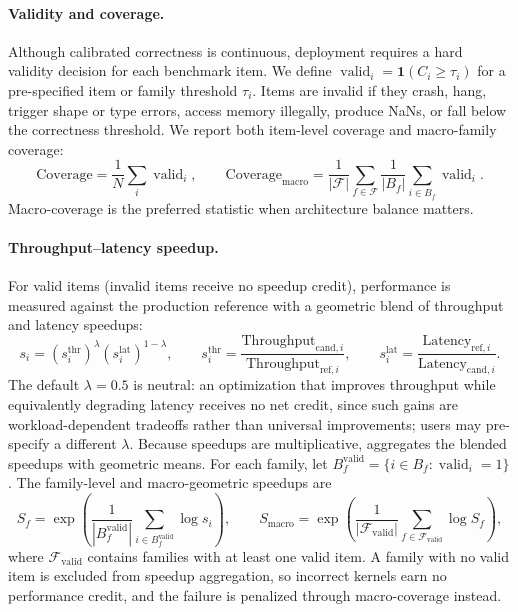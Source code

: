 \paragraph{Validity and coverage.}
Although calibrated correctness is continuous, deployment requires a hard validity decision for each benchmark item.
We define $\operatorname{valid}_i = \mathbf{1}(C_i \ge \tau_i)$ for a pre-specified item or family threshold $\tau_i$.
Items are invalid if they crash, hang, trigger shape or type errors, access memory illegally, produce NaNs, or fall below the correctness threshold.
We report both item-level coverage and macro-family coverage:
\begin{equation}
\mathrm{Coverage} = \frac{1}{N}\sum_i \operatorname{valid}_i,
\qquad
\mathrm{Coverage}_{\mathrm{macro}} =
\frac{1}{|\mathcal{F}|}\sum_{f \in \mathcal{F}}
\frac{1}{|B_f|}\sum_{i \in B_f}\operatorname{valid}_i.
\end{equation}
Macro-coverage is the preferred statistic when architecture balance matters.

\paragraph{Throughput--latency speedup.}
For valid items (invalid items receive no speedup credit), performance is measured against the production reference with a geometric blend of throughput and latency speedups:
\begin{equation}
s_i =
\left(s_i^{\mathrm{thr}}\right)^{\lambda}
\left(s_i^{\mathrm{lat}}\right)^{1-\lambda},
\qquad
s_i^{\mathrm{thr}} =
\frac{\mathrm{Throughput}_{\mathrm{cand},i}}
     {\mathrm{Throughput}_{\mathrm{ref},i}},
\qquad
s_i^{\mathrm{lat}} =
\frac{\mathrm{Latency}_{\mathrm{ref},i}}
     {\mathrm{Latency}_{\mathrm{cand},i}}.
\end{equation}
The default $\lambda = 0.5$ is neutral: an optimization that improves throughput while equivalently degrading latency receives no net credit, since such gains are workload-dependent tradeoffs rather than universal improvements; users may pre-specify a different $\lambda$.
Because speedups are multiplicative, \fastkernels{} aggregates the blended speedups with geometric means.
For each family, let $B_f^{\mathrm{valid}} = \{i \in B_f : \operatorname{valid}_i = 1\}$.
The family-level and macro-geometric speedups are
\begin{equation}
S_f =
\exp\left(
\frac{1}{|B_f^{\mathrm{valid}}|}
\sum_{i \in B_f^{\mathrm{valid}}}\log s_i
\right),
\qquad
S_{\mathrm{macro}} =
\exp\left(
\frac{1}{|\mathcal{F}_{\mathrm{valid}}|}
\sum_{f \in \mathcal{F}_{\mathrm{valid}}}\log S_f
\right),
\end{equation}
where $\mathcal{F}_{\mathrm{valid}}$ contains families with at least one valid item.
A family with no valid item is excluded from speedup aggregation, so incorrect kernels earn no performance credit, and the failure is penalized through macro-coverage instead.

